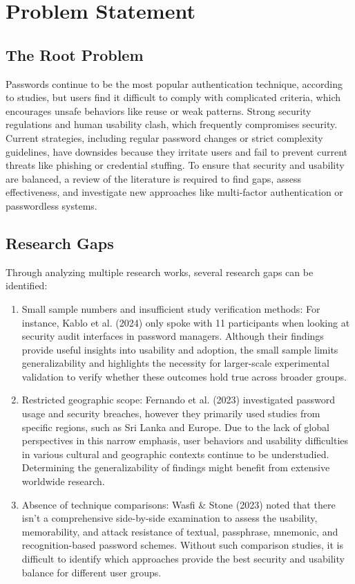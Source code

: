 \documentclass[a4paper, 12pt]{article}
\begin{document}
\section{Problem Statement}
\subsection*{The Root Problem}
Passwords continue to be the most popular authentication technique, according to studies, but users find it difficult to comply with complicated criteria, which encourages unsafe behaviors like reuse or weak patterns. Strong security regulations and human usability clash, which frequently compromises security. Current strategies, including regular password changes or strict complexity guidelines, have downsides because they irritate users and fail to prevent current threats like phishing or credential stuffing. To ensure that security and usability are balanced, a review of the literature is required to find gaps, assess effectiveness, and investigate new approaches like multi-factor authentication or passwordless systems.

\subsection*{Research Gaps}
Through analyzing multiple research works, several research gaps can be identified: 
\begin{enumerate} 
	\item Small sample numbers and insufficient study verification methods: For instance, Kablo et al. (2024) only spoke with 11 participants when looking at security audit interfaces in password managers. Although their findings provide useful insights into usability and adoption, the small sample limits generalizability and highlights the necessity for larger-scale experimental validation to verify whether these outcomes hold true across broader groups.
 
	\item Restricted geographic scope: Fernando et al. (2023) investigated password usage and security breaches, however they primarily used studies from specific regions, such as Sri Lanka and Europe. Due to the lack of global perspectives in this narrow emphasis, user behaviors and usability difficulties in various cultural and geographic contexts continue to be understudied. Determining the generalizability of findings might benefit from extensive worldwide research.
	
	\item Absence of technique comparisons: Wasfi \& Stone (2023) noted that there isn't a comprehensive side-by-side examination to assess the usability, memorability, and attack resistance of textual, passphrase, mnemonic, and recognition-based password schemes. Without such comparison studies, it is difficult to identify which approaches provide the best security and usability balance for different user groups.
\end{enumerate}
\end{document}
